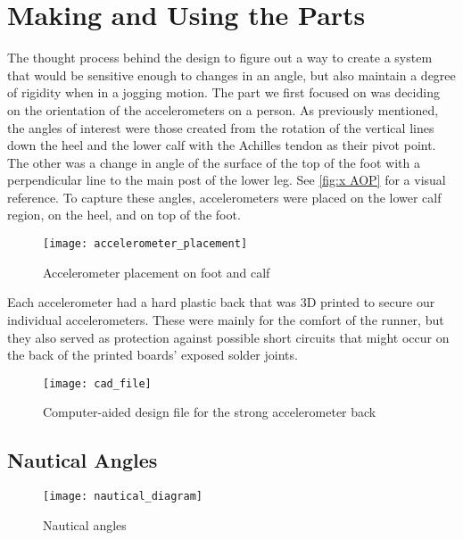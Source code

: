 \section{Making and Using the Parts}
\label{sec:making}

The thought process behind the design to figure out a way to create a system that would be sensitive enough to changes in an angle, but also maintain a degree of rigidity when in a jogging motion.
The part we first focused on was deciding on the orientation of the accelerometers on a person.
As previously mentioned, the angles of interest were those created from the rotation of the vertical lines down the heel and the lower calf with the Achilles tendon as their pivot point.
The other was a change in angle of the surface of the top of the foot with a perpendicular line to the main post of the lower leg.
See \ref{fig:x AOP} for a visual reference.
To capture these angles, accelerometers were placed on the lower calf region, on the heel, and on top of the foot.\par

\begin{figure}[h]
  \centering
  \texttt{[image: accelerometer\_placement]}
  \caption[Accelerometer placement]{Accelerometer placement on foot and calf}
  \label{fig:x foot and calf}
\end{figure}

Each accelerometer had a hard plastic back that was 3D printed to secure our individual accelerometers.
These were mainly for the comfort of the runner, but they also served as protection against possible short circuits that might occur on the back of the printed boards' exposed solder joints.\par

\begin{figure}[h]
  \centering
  \texttt{[image: cad\_file]}
  \caption[CAD file]{Computer-aided design file for the strong accelerometer back}
  \label{fig:x cad file}
\end{figure}

\subsection{Nautical Angles}
\begin{wrapfigure}{R}{0.25\textwidth}
  \begin{center}
  \texttt{[image: nautical\_diagram]}
\end{center}
  \caption[Nautical angle diagram]{Nautical angles}
  \label{fig:x nautical}
\end{wrapfigure}

